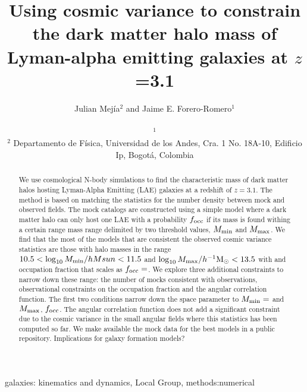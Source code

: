 \documentclass[usenatbib]{mn2e}
\newcommand{\hMsun}{{\ifmmode{h^{-1}{\rm {M_{\odot}}}}\else{$h^{-1}{\rm{M_{\odot}}}$}\fi}}
\begin{document}
\title[Dark Matter Halo Mass for LAEs  at $z=3.1$]{Using cosmic
  variance to constrain the dark matter halo mass of Lyman-alpha
  emitting galaxies at $z$=3.1} 
  
\author[~J.~E. Forero-Romero and J. Mejia]{
\parbox[t]{\textwidth}{\raggedright 
  Julian Mej\'ia$^{2}$ and
Jaime E. Forero-Romero$^{1}$}
\vspace*{6pt}\\
$^{1}$\\
$^{2}$ Departamento de F\'{i}sica, Universidad de los Andes, Cra. 1
No. 18A-10, Edificio Ip, Bogot\'a, Colombia 
}

\maketitle

\begin{abstract}
We use cosmological N-body simulations to find the characteristic mass
of dark matter halos hosting Lyman-Alpha Emitting (LAE) galaxies at a
redshift of $z=3.1$. The method is based on matching the statistics
for the number density between mock and observed fields. The mock
catalogs are constructed using a simple model where a dark matter halo
can only host one LAE with a probability $f_{\rm occ}$ if its mass is
found withing a certain range mass range delimited by two threshold
values, $M_{\rm min}$ and $M_{\rm max}$. We find that the most of the models that
are consistent the observed cosmic variance statistics are those with
halo masses in the range $10.5 < \log_{10} M_{\rm  min}/hMsun < 11.5$
and $\log_{10} M_{\rm max}/\hMsun < 13.5$ with and occupation fraction
that scales as $f_{\rm occ}=$. We explore three additional constraints
to narrow down these range: the number of mocks consistent with 
observations, observational constraints on the occupation fraction and
the angular correlation function. The first two conditions narrow down
the space parameter to $M_{\rm min}=$ and $M_{\rm max}$, $f_{\rm occ}$. The angular
correlation function does not add a significant constraint due to the
cosmic variance in the small angular fields where this statistics has
been computed so far. We make available the mock data for the best
models in a public repository. Implications for galaxy formation
models? 
\end{abstract}

\begin{keywords}
{galaxies: kinematics and dynamics, Local Group, methods:numerical}
\end{keywords}
\end{document}

